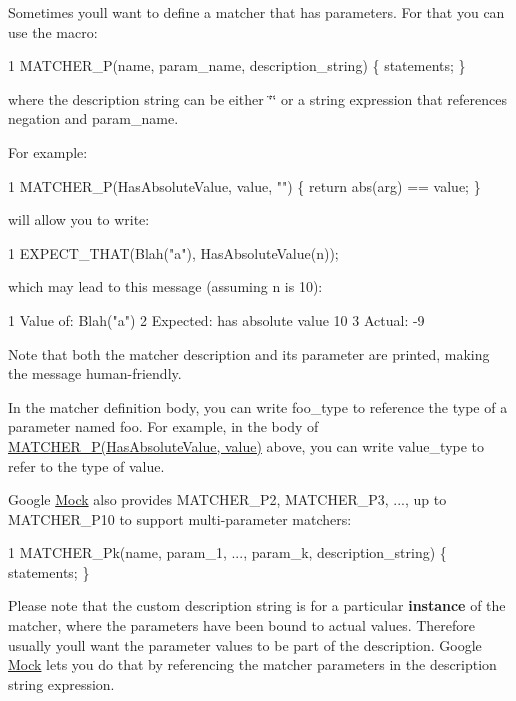 Sometimes you\textquotesingle{}ll want to define a matcher that has parameters. For that you can use the macro\+: 
\begin{DoxyCode}
1 MATCHER\_P(name, param\_name, description\_string) \{ statements; \}
\end{DoxyCode}
 where the description string can be either {\ttfamily \char`\"{}\char`\"{}} or a string expression that references {\ttfamily negation} and {\ttfamily param\+\_\+name}.

For example\+: 
\begin{DoxyCode}
1 MATCHER\_P(HasAbsoluteValue, value, "") \{ return abs(arg) == value; \}
\end{DoxyCode}
 will allow you to write\+: 
\begin{DoxyCode}
1 EXPECT\_THAT(Blah("a"), HasAbsoluteValue(n));
\end{DoxyCode}
 which may lead to this message (assuming {\ttfamily n} is 10)\+: 
\begin{DoxyCode}
1 Value of: Blah("a")
2 Expected: has absolute value 10
3   Actual: -9
\end{DoxyCode}


Note that both the matcher description and its parameter are printed, making the message human-\/friendly.

In the matcher definition body, you can write {\ttfamily foo\+\_\+type} to reference the type of a parameter named {\ttfamily foo}. For example, in the body of {\ttfamily \hyperlink{gmock-generated-matchers_8h_acb7ae915efa2fd8d3f6ea7313198afb6}{M\+A\+T\+C\+H\+E\+R\+\_\+\+P(\+Has\+Absolute\+Value, value)}} above, you can write {\ttfamily value\+\_\+type} to refer to the type of {\ttfamily value}.

Google \hyperlink{class_mock}{Mock} also provides {\ttfamily M\+A\+T\+C\+H\+E\+R\+\_\+\+P2}, {\ttfamily M\+A\+T\+C\+H\+E\+R\+\_\+\+P3}, ..., up to {\ttfamily M\+A\+T\+C\+H\+E\+R\+\_\+\+P10} to support multi-\/parameter matchers\+: 
\begin{DoxyCode}
1 MATCHER\_Pk(name, param\_1, ..., param\_k, description\_string) \{ statements; \}
\end{DoxyCode}


Please note that the custom description string is for a particular {\bfseries instance} of the matcher, where the parameters have been bound to actual values. Therefore usually you\textquotesingle{}ll want the parameter values to be part of the description. Google \hyperlink{class_mock}{Mock} lets you do that by referencing the matcher parameters in the description string expression.

